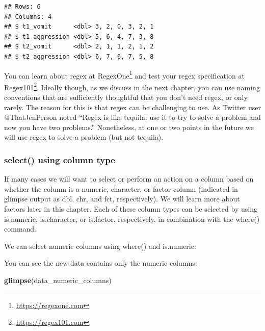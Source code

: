 \documentclass[
]{krantz}
\makeatletter
\newenvironment{Shaded}{\begin{snugshade}}{\end{snugshade}}
\newcommand{\KeywordTok}[1]{\textcolor[rgb]{0.27,0.27,0.27}{\textbf{#1}}}
\newcommand{\NormalTok}[1]{#1}
\newcommand{\OperatorTok}[1]{\textcolor[rgb]{0.43,0.43,0.43}{\textbf{#1}}}
\newcommand{\StringTok}[1]{\textcolor[rgb]{0.5,0.5,0.5}{#1}}
\renewcommand{\href}[2]{#2\footnote{\url{#1}}}
\newenvironment{kframe}{%
\medskip{}
\setlength{\fboxsep}{.8em}
 \def\at@end@of@kframe{}%
 \ifinner\ifhmode%
  \def\at@end@of@kframe{\end{minipage}}%
  \begin{minipage}{\columnwidth}%
 \fi\fi%
 \def\FrameCommand##1{\hskip\@totalleftmargin \hskip-\fboxsep
 \colorbox{shadecolor}{##1}\hskip-\fboxsep
     \hskip-\linewidth \hskip-\@totalleftmargin \hskip\columnwidth}%
 \MakeFramed {\advance\hsize-\width
   \@totalleftmargin\z@ \linewidth\hsize
   \@setminipage}}%
 {\par\unskip\endMakeFramed%
 \at@end@of@kframe}
\renewenvironment{Shaded}{\begin{kframe}}{\end{kframe}}
\makeatother
\begin{document}
\begin{verbatim}
## Rows: 6
## Columns: 4
## $ t1_vomit      <dbl> 3, 2, 0, 3, 2, 1
## $ t1_aggression <dbl> 5, 6, 4, 7, 3, 8
## $ t2_vomit      <dbl> 2, 1, 1, 2, 1, 2
## $ t2_aggression <dbl> 6, 7, 6, 7, 5, 8
\end{verbatim}

You can learn about regex at \href{https://regexone.com}{RegexOne} and test your regex specification at \href{https://regex101.com}{Regex101}. Ideally though, as we discuss in the next chapter, you can use naming conventions that are sufficiently thoughtful that you don't need regex, or only rarely. The reason for this is that regex can be challenging to use. As Twitter user @ThatJenPerson noted ``Regex is like tequila: use it to try to solve a problem and now you have two problems.'' Nonetheless, at one or two points in the future we will use regex to solve a problem (but not tequila).

\hypertarget{select-using-column-type}{%
\subsubsection{select() using column type}\label{select-using-column-type}}

If many cases we will want to select or perform an action on a column based on whether the column is a numeric, character, or factor column (indicated in glimpse output as dbl, chr, and fct, respectively). We will learn more about factors later in this chapter. Each of these column types can be selected by using is.numeric, is.character, or is.factor, respectively, in combination with the where() command.

We can select numeric columns using where() and is.numeric:

\begin{Shaded}
\end{Shaded}

You can see the new data contains only the numeric columns:

\begin{Shaded}
\begin{Highlighting}[]
\KeywordTok{glimpse}\NormalTok{(data_numeric_columns)}
\end{Highlighting}
\end{Shaded}
\end{document}
